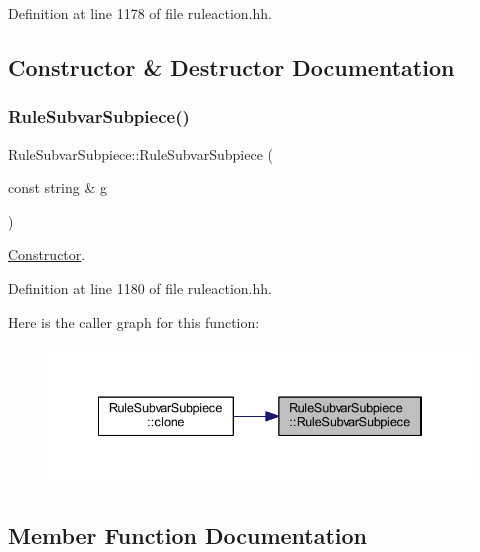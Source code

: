 Definition at line 1178 of file ruleaction.\+hh.



\subsection{Constructor \& Destructor Documentation}
\mbox{\label{class_rule_subvar_subpiece_a5a2cc5ce7009e68b02f156cf68594138}} 
\subsubsection{\texorpdfstring{RuleSubvarSubpiece()}{RuleSubvarSubpiece()}}
{\footnotesize\ttfamily Rule\+Subvar\+Subpiece\+::\+Rule\+Subvar\+Subpiece (\begin{DoxyParamCaption}\item[{const string \&}]{g }\end{DoxyParamCaption})\hspace{0.3cm}{\ttfamily [inline]}}



\mbox{\hyperlink{class_constructor}{Constructor}}. 



Definition at line 1180 of file ruleaction.\+hh.

Here is the caller graph for this function\+:
\nopagebreak
\begin{figure}[H]
\begin{center}
\leavevmode
\includegraphics[width=334pt]{class_rule_subvar_subpiece_a5a2cc5ce7009e68b02f156cf68594138_icgraph}
\end{center}
\end{figure}


\subsection{Member Function Documentation}
\mbox{\label{class_rule_subvar_subpiece_aa55e18a43a85344e1e29c985d707a393}} 
